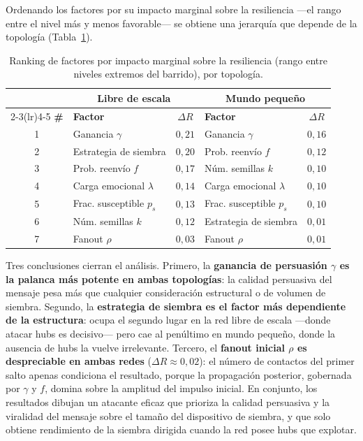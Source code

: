 \documentclass[12pt]{extarticle}
\numberwithin{equation}{section}
\begin{document}
Ordenando los factores por su impacto marginal sobre la resiliencia —el rango entre el nivel más y menos favorable— se obtiene una jerarquía que depende de la topología (Tabla~\ref{tab:ranking}).

\begin{table}[H]
  \centering
  \small
  \caption{Ranking de factores por impacto marginal sobre la resiliencia (rango entre niveles extremos del barrido), por topología.}
  \label{tab:ranking}
  \begin{tabular}{@{}c l c l c@{}}
    \toprule
    & \multicolumn{2}{c}{\textbf{Libre de escala}} & \multicolumn{2}{c}{\textbf{Mundo pequeño}} \\
    \cmidrule(lr){2-3}\cmidrule(lr){4-5}
    \textbf{\#} & \textbf{Factor} & \textbf{$\Delta R$} & \textbf{Factor} & \textbf{$\Delta R$} \\
    \midrule
    1 & Ganancia $\gamma$            & $0{,}21$ & Ganancia $\gamma$            & $0{,}16$ \\
    2 & Estrategia de siembra       & $0{,}20$ & Prob. reenvío $f$           & $0{,}12$ \\
    3 & Prob. reenvío $f$           & $0{,}17$ & Núm. semillas $k$           & $0{,}10$ \\
    4 & Carga emocional $\lambda$   & $0{,}14$ & Carga emocional $\lambda$   & $0{,}10$ \\
    5 & Frac. susceptible $p_s$     & $0{,}13$ & Frac. susceptible $p_s$     & $0{,}10$ \\
    6 & Núm. semillas $k$           & $0{,}12$ & Estrategia de siembra       & $0{,}01$ \\
    7 & Fanout $\rho$               & $0{,}03$ & Fanout $\rho$               & $0{,}01$ \\
    \bottomrule
  \end{tabular}
\end{table}

Tres conclusiones cierran el análisis. Primero, la \textbf{ganancia de persuasión $\gamma$ es la palanca más potente en ambas topologías}: la calidad persuasiva del mensaje pesa más que cualquier consideración estructural o de volumen de siembra. Segundo, la \textbf{estrategia de siembra es el factor más dependiente de la estructura}: ocupa el segundo lugar en la red libre de escala —donde atacar hubs es decisivo— pero cae al penúltimo en mundo pequeño, donde la ausencia de hubs la vuelve irrelevante. Tercero, el \textbf{fanout inicial $\rho$ es despreciable en ambas redes} ($\Delta R \approx 0{,}02$): el número de contactos del primer salto apenas condiciona el resultado, porque la propagación posterior, gobernada por $\gamma$ y $f$, domina sobre la amplitud del impulso inicial. En conjunto, los resultados dibujan un atacante eficaz que prioriza la calidad persuasiva y la viralidad del mensaje sobre el tamaño del dispositivo de siembra, y que solo obtiene rendimiento de la siembra dirigida cuando la red posee hubs que explotar.
\end{document}
